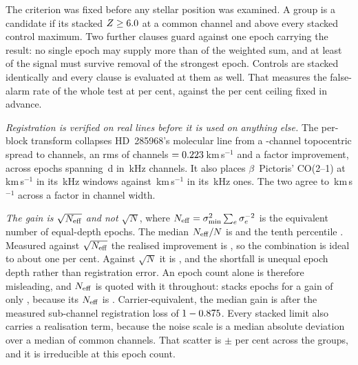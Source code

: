 The criterion was fixed before any stellar position was examined. A group is a candidate if its stacked $Z\ge6.0$ at a common channel
and above every stacked control maximum. Two further clauses guard against
one epoch carrying the result: no single epoch may supply more than
\StkDomMax{} of the weighted sum, and at least \StkJkMin{} of the signal
must survive removal of the strongest epoch. Controls are stacked
identically and every clause is evaluated at them as well. That measures the
false-alarm rate of the whole test at \StkCtrlFap{} per cent, against the
\StkFapCeil{} per cent ceiling fixed in advance.

\emph{Registration is verified on real lines before it is used on anything
else.} The per-block transform collapses HD~285968's molecular line from a
\StkRegTopoChan-channel topocentric spread to \StkRegStellarChan{}
channels, an rms of \StkRegRmsChan{} channels $=0.223$\,km\,s$^{-1}$
and a factor \StkRegFactor{} improvement, across \StkRegNEpoch{} epochs
spanning \StkRegSpanD\,d in \StkRegChanKHz\,kHz channels. It also places
$\beta$~Pictoris' CO(2--1) at \StkRegBpVsf\,km\,s$^{-1}$ in its
\StkRegBpChanA\,kHz windows against \StkBpCoTwoOff\,km\,s$^{-1}$ in its
\StkRegBpChanB\,kHz ones. The two agree to \StkRegCrossKms\,km\,s$^{-1}$
across a factor \StkRegBpChanRatio{} in channel width.

\emph{The gain is $\sqrt{N_{\rm eff}}$ and not $\sqrt{N}$}, where
$N_{\rm eff}=\sigma_{\min}^{2}\sum_e\sigma_e^{-2}$ is the equivalent number
of equal-depth epochs. The median $N_{\rm eff}/N$ is \StkNeffFrac{} and the
tenth percentile \StkNeffFracPTen. Measured against $\sqrt{N_{\rm eff}}$ the
realised improvement is \StkGainVsNeff, so the combination is ideal to about
one per cent. Against $\sqrt{N}$ it is \StkGainVsN, and the shortfall is
unequal epoch depth rather than registration error. An epoch count alone is
therefore misleading, and $N_{\rm eff}$ is quoted with it throughout:
\StkWorstStar{} stacks \StkWorstN{} epochs for a gain of only
\StkWorstGain, because its $N_{\rm eff}$ is \StkWorstNeff.
Carrier-equivalent, the median gain is \StkCarrierGainMed{} after the
measured sub-channel registration loss of $1-0.875$. Every stacked
limit also carries a realisation term, because the noise scale is a median
absolute deviation over a median of \StkNChanMed{} common channels. That
scatter is $\pm$\StkMadZScatterPct{} per cent across the \StkNGroup{}
groups, and it is irreducible at this epoch count.

